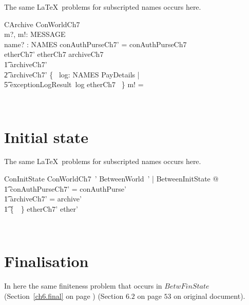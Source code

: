The same \LaTeX\ problems for subscripted names occurs here.
%
\begin{LSDef}
\begin{schema}{CArchive}
  \Delta ConWorldCh7
  \\      m?, m!: MESSAGE
  \\      name? : NAMES
  \where
  conAuthPurseCh7' = conAuthPurseCh7
  \\      etherCh7' \subseteq etherCh7
  \also
  archiveCh7 \subseteq
\\ \t1          archiveCh7' \subseteq
  \\ \t2          archiveCh7' \cup \{~ log: NAMES \cross PayDetails |
  \\ \t5                          exceptionLogResult~log \in etherCh7 ~\}
  \also
  m! = \bot
\end{schema}~\end{LSDef}

\section{Initial state}

The same \LaTeX\ problems for subscripted names occurs here.
%
\begin{LSDef}
\begin{schema}{ConInitState}
  ConWorldCh7~'
  \where
  \exists BetweenWorld~' | BetweenInitState @
  \\ \t1          conAuthPurseCh7' = conAuthPurse'
  \\ \t1          \land archiveCh7' = archive'
  \\ \t1          \land \{~\bot~\} \subseteq etherCh7' \subseteq ether'
\end{schema}~\end{LSDef}

\section{Finalisation}

In here the same finiteness problem that occurs in $BetwFinState$
(Section~\ref{ch6.final} on page \pageref{ch6.final}) (Section $6.2$ on page
$53$ on original document).

